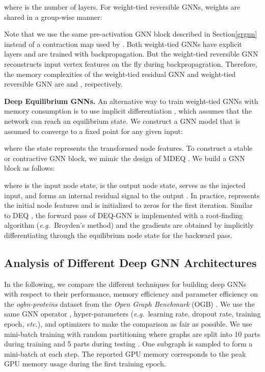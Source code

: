 \documentclass{article}
\newcommand{\eg}{\emph{e.g.~}}
\newcommand{\etc}{\emph{etc.\xspace}}
\newcommand{\secLabel}{Section\xspace}
\newcommand{\mysection}[1]{\vspace{0pt}\noindent\textbf{#1.}}
\begin{document}
where  is the number of layers. For weight-tied reversible GNNs, weights are shared in a group-wise manner:

Note that we use the same pre-activation GNN block described in \secLabel \ref{grgnn} instead of a contraction map used by \citet{scarselli2008graph}. Both weight-tied GNNs have explicit layers and are trained with backpropagation. But the weight-tied reversible GNN reconstructs input vertex features on the fly during backpropagration. Therefore, the memory complexities of the weight-tied residual GNN and weight-tied reversible GNN are  and , respectively.

\mysection{Deep Equilibrium GNNs}
An alternative way to train weight-tied GNNs with  memory consumption is to use implicit differentiation \citep{scarselli2008graph, bai2019deep}, which assumes that the network can reach an equilibrium state. We construct a GNN model that is assumed to converge to a fixed point  for any given input:

where the state  represents the transformed node features. To construct a stable or contractive GNN block, we mimic the design of MDEQ \citep{bai2020multiscale}. We build a GNN block as follows:

where  is the input node state,  is the output node state,  serves as the injected input, and  forms an internal residual signal to the output . In practice,  represents the initial node features and  is initialized to zeros for the first iteration. Similar to DEQ \citep{bai2019deep}, the forward pass of DEQ-GNN is implemented with a root-finding algorithm (\eg Broyden’s method) and the gradients are obtained by implicitly differentiating through the equilibrium node state for the backward pass.

\subsection{Analysis of Different Deep GNN Architectures} \label{sec:analysis_deep}
In the following, we compare the different techniques for building deep GNNs with respect to their performance, memory efficiency and parameter efficiency on the \emph{ogbn-proteins} dataset from the \emph{Open Graph Benchmark} (OGB) \citep{hu2020open}. We use the same GNN operator \citep{li2020deepergcn}, hyper-parameters (\eg learning rate, dropout rate, training epoch, \etc), and optimizers to make the comparison as fair as possible.
We use mini-batch training with random partitioning where graphs are split into 10 parts during training and 5 parts during testing \citep{li2020deepergcn}. One subgraph is sampled to form a mini-batch at each step. 
The reported GPU memory corresponds to the peak GPU memory usage during the first training epoch.
\end{document}
